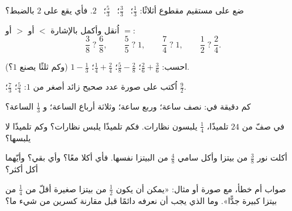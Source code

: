 \begin{exercise}[$\star$]\label{exo:g4:fractions:4}
ضع على مستقيم مقطوع أثلاثًا: $\frac13$؛ \ $\frac33$؛ \
$\frac53$؛ \ $2$. فأي  يقع على $2$ بالضبط؟
\end{exercise}

\begin{exercise}[$\star$]\label{exo:g4:fractions:5}
اُنقل وأكمل بالإشارة $<$ أو $>$ أو $=$:
\[
\frac38 \;?\; \frac68, \qquad
\frac55 \;?\; 1, \qquad
\frac74 \;?\; 1, \qquad
\frac12 \;?\; \frac24 .
\]
\end{exercise}

\begin{exercise}[$\star$]\label{exo:g4:fractions:6}
احسب: $\frac26 + \frac36$؛ \quad $\frac58 - \frac28$؛ \quad
$\frac14 + \frac24$؛ \quad $1 - \frac13$ (وكم ثلثًا يصنع
$1$؟).
\end{exercise}

\begin{exercise}[$\star$]\label{exo:g4:fractions:7}
اُكتب على صورة عدد صحيح زائد \omterm{def:g4:fractions:def}{كسر} أصغر من $1$:
$\frac54$؛ \quad $\frac73$؛ \quad $\frac{9}{2}$.
\end{exercise}

\begin{exercise}[$\star$]\label{exo:g4:fractions:8}
كم دقيقة في: نصف ساعة؛ وربع ساعة؛ وثلاثة
أرباع الساعة؛ و $\frac13$ الساعة؟
\end{exercise}

\begin{exercise}[$\star$]\label{exo:g4:fractions:9}
في صفّ من $24$ تلميذًا، $\frac14$ يلبسون نظارات. فكم تلميذًا
يلبس نظارات؟ وكم تلميذًا لا يلبسها؟
\end{exercise}

\begin{exercise}[$\star\star$]\label{exo:g4:fractions:10}
أكلت نور $\frac38$ من بيتزا وأكل سامي $\frac48$ من البيتزا
نفسها. فأي  أكلا معًا؟ وأي  بقي؟
وأيّهما أكل أكثر؟
\end{exercise}

\begin{exercise}[$\star\star$]\label{exo:g4:fractions:11}
صواب أم خطأ، مع صورة أو مثال: «يمكن أن يكون $\frac12$ من
بيتزا صغيرة أقلّ من $\frac14$ من بيتزا كبيرة جدًّا».
وما الذي يجب أن نعرفه دائمًا قبل مقارنة كسرين من
شيء ما؟
\end{exercise}
